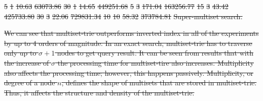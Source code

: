 \documentclass[10pt,letterpaper]{article}
\providecommand{\DIFdeltex}[1]{{\protect\color{red}\sout{#1}}}                      %
\providecommand{\DIFdelFL}[1]{\DIFdel{#1}} %
\providecommand{\DIFdel}[1]{\texorpdfstring{\DIFdeltex{#1}}{}} %
\begin{document}
\DIFdelFL{5		}%
\DIFdelFL{1 		}%
\DIFdelFL{10.63 }%
\DIFdelFL{63073.86}%
\DIFdelFL{30	}%
\DIFdelFL{1 		}%
\DIFdelFL{14.65 }%
\DIFdelFL{449251.68}%
\DIFdelFL{5		}%
\DIFdelFL{3 		}%
\DIFdelFL{171.04 }%
\DIFdelFL{163256.77}%
\DIFdelFL{15	}%
\DIFdelFL{3 		}%
\DIFdelFL{43.42 }%
\DIFdelFL{425733.80}%
\DIFdelFL{30	}%
\DIFdelFL{3 		}%
\DIFdelFL{22.06 }%
\DIFdelFL{729831.34}%
\DIFdelFL{10	}%
\DIFdelFL{10 	}%
\DIFdelFL{58.32 }%
\DIFdelFL{373784.81}%
{%
\DIFdelFL{Super-multiset search.}}

\DIFdel{We can see that multiset-trie outperforms inverted index in all of the experiments by up to 4 orders of magnitude. In an exact search, multiset-trie has to traverse only up to $\sigma+1$ nodes to get query result. It can be seen from results that with the increase of $\sigma$ the processing time for multiset-tire also increases. Multiplicity also affects the processing time; however, this happens passively. Multiplicity, or degree of a node $n$, defines the shape of multisets that are stored in multiset-trie. Thus, it affects the structure and density of the multiset-trie.
}%
\end{document}
